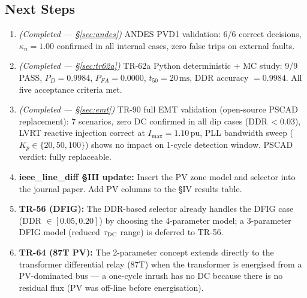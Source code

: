 \documentclass[11pt, a4paper]{article}
\newcommand{\kn}{\kappa_n}
\begin{document}
\subsection{Next Steps}

\begin{enumerate}
  \item[\checkmark] \textit{(Completed --- §\ref{sec:andes})}
    ANDES PVD1 validation: 6/6 correct decisions, $\kn=1.00$ confirmed in
    all internal cases, zero false trips on external faults.

  \item[\checkmark] \textit{(Completed --- §\ref{sec:tr62a})}
    TR-62a Python deterministic + MC study: 9/9 PASS,
    $P_D=0.9984$, $P_{FA}=0.0000$, $t_{50}=20\,\text{ms}$,
    DDR accuracy $=0.9984$.  All five acceptance criteria met.

  \item[\checkmark] \textit{(Completed --- §\ref{sec:emt})}
    TR-90 full EMT validation (open-source PSCAD replacement):
    7 scenarios, zero DC confirmed in all dip cases (DDR\,$<0.03$),
    LVRT reactive injection correct at $I_{\max}=1.10\,\text{pu}$,
    PLL bandwidth sweep ($K_p \in \{20,50,100\}$) shows no impact on
    1-cycle detection window.  PSCAD verdict: fully replaceable.

  \item \textbf{ieee\_line\_diff §III update:}  Insert the PV zone model and
    selector into the journal paper.  Add PV columns to the §IV results table.

  \item \textbf{TR-56 (DFIG):}  The DDR-based selector already handles the
    DFIG case (DDR $\in [0.05, 0.20]$) by choosing the 4-parameter model;
    a 3-parameter DFIG model (reduced $\tau_{\rm DC}$ range) is deferred to
    TR-56.

  \item \textbf{TR-64 (87T PV):}  The 2-parameter concept extends directly to
    the transformer differential relay (87T) when the transformer is energised
    from a PV-dominated bus — a one-cycle inrush has no DC because there is no
    residual flux (PV was off-line before energisation).
\end{enumerate}



\end{document}
